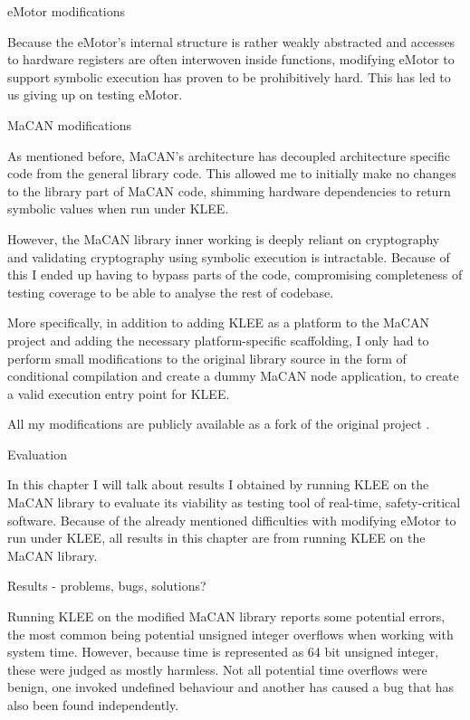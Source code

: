 \sec eMotor modifications

Because the eMotor's internal structure is rather weakly abstracted and
accesses to hardware registers are often interwoven inside functions, modifying
eMotor to support symbolic execution has proven to be prohibitively hard. This
has led to us giving up on testing eMotor.


\sec MaCAN modifications

As mentioned before, MaCAN's architecture has decoupled architecture specific
code from the general library code. This allowed me to initially make no
changes to the library part of MaCAN code, shimming hardware dependencies to
return symbolic values when run under KLEE.

However, the MaCAN library inner working is deeply reliant on cryptography and
validating cryptography using symbolic execution is intractable. Because of
this I ended up having to bypass parts of the code, compromising completeness
of testing coverage to be able to analyse the rest of codebase.

More specifically, in addition to adding KLEE as a platform to the MaCAN project
and adding the necessary platform-specific scaffolding, I only had to perform
small modifications to the original library source in the form of conditional
compilation and create a dummy MaCAN node application, to create a valid
execution entry point for KLEE.

All my modifications are publicly available as a fork of the original project
.

\chap Evaluation

In this chapter I will talk about results I obtained by running KLEE on the
MaCAN library to evaluate its viability as testing tool of real-time,
safety-critical software. Because of the already mentioned difficulties with
modifying eMotor to run under KLEE, all results in this chapter are from
running KLEE on the MaCAN library.

\sec Results - problems, bugs, solutions?

Running KLEE on the modified MaCAN library reports some potential errors, the
most common being potential unsigned integer overflows when working with system
time. However, because time is represented as 64 bit unsigned integer, these
were judged as mostly harmless. Not all potential time overflows were benign,
one invoked undefined behaviour and another has caused a bug that has also been
found independently.

